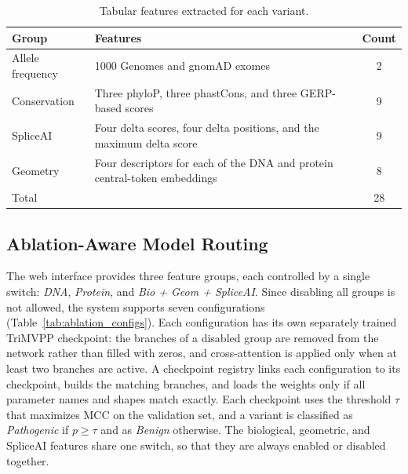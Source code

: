 \begin{table}[htbp]
    \centering
    \caption{Tabular features extracted for each variant.}
    \label{tab:tabular_features}
    \begin{tabular}{lp{}c}
        \toprule
        \textbf{Group} & \textbf{Features} & \textbf{Count} \\
        \midrule
        Allele frequency & 1000 Genomes and gnomAD exomes & 2 \\
        Conservation & Three phyloP, three phastCons, and three GERP-based scores & 9 \\
        SpliceAI & Four delta scores, four delta positions, and the maximum delta score & 9 \\
        Geometry & Four descriptors for each of the DNA and protein central-token embeddings & 8 \\
        \midrule
        Total & & 28 \\
        \bottomrule
    \end{tabular}
\end{table}

\subsection{Ablation-Aware Model Routing}

The web interface provides three feature groups, each controlled by a single switch: \textit{DNA}, \textit{Protein}, and \textit{Bio + Geom + SpliceAI}. Since disabling all groups is not allowed, the system supports seven configurations (Table~\ref{tab:ablation_configs}). Each configuration has its own separately trained TriMVPP checkpoint: the branches of a disabled group are removed from the network rather than filled with zeros, and cross-attention is applied only when at least two branches are active. A checkpoint registry links each configuration to its checkpoint, builds the matching branches, and loads the weights only if all parameter names and shapes match exactly. Each checkpoint uses the threshold $\tau$ that maximizes MCC on the validation set, and a variant is classified as \textit{Pathogenic} if $p \geq \tau$ and as \textit{Benign} otherwise. The biological, geometric, and SpliceAI features share one switch, so that they are always enabled or disabled together.

